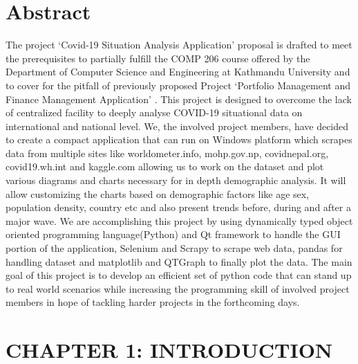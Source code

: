 \documentclass{article}
\begin{document}
\section*{Abstract}
The project ‘Covid-19 Situation Analysis Application’ proposal is drafted to meet the prerequisites to partially fulfill the COMP 206 course offered by the 
Department of Computer Science and Engineering at Kathmandu University and to cover for the pitfall of previously proposed Project ‘Portfolio Management and 
Finance Management Application’ . This project is designed to overcome the lack of centralized facility to deeply analyse COVID-19 situational data on international 
and national level. We, the involved project members, have decided to create a compact application that can run on Windows platform which scrapes data from multiple sites 
like worldometer.info, mohp.gov.np, covidnepal.org, covid19.wh.int and kaggle.com  allowing us to work on the dataset and plot various diagrams and charts necessary for in 
depth demographic analysis. It will allow customizing the charts based on demographic factors like age sex, population density, country etc and also present trends before, 
during and after a major wave. We are accomplishing this project by using dynamically typed object oriented programming language(Python) and Qt framework to handle the GUI 
portion of the application, Selenium and Scrapy to scrape web data, pandas for handling dataset and matplotlib and QTGraph to finally plot the data. The main goal of this 
project is to develop an efficient set of python code that can stand up to real world scenarios while increasing the programming skill of involved project members in hope 
of tackling harder projects in the forthcoming days.

\clearpage
\thispagestyle{empty}
\tableofcontents

\clearpage
\thispagestyle{empty}
\listoffigures

\clearpage
{}
\section{CHAPTER 1: INTRODUCTION}
\end{document}
